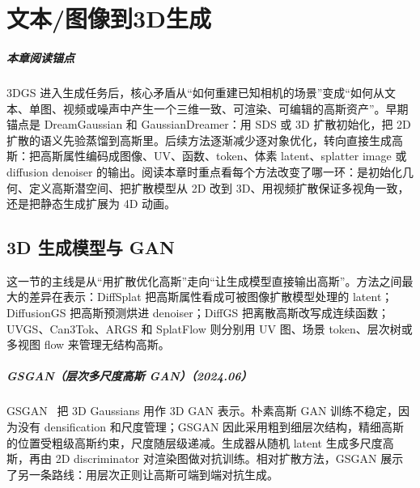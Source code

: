 \chapter{文本/图像到3D生成}

\paragraph*{本章阅读锚点}
3DGS 进入生成任务后，核心矛盾从“如何重建已知相机的场景”变成“如何从文本、单图、视频或噪声中产生一个三维一致、可渲染、可编辑的高斯资产”。早期锚点是 DreamGaussian 和 GaussianDreamer：用 SDS 或 3D 扩散初始化，把 2D 扩散的语义先验蒸馏到高斯里。后续方法逐渐减少逐对象优化，转向直接生成高斯：把高斯属性编码成图像、UV、函数、token、体素 latent、splatter image 或 diffusion denoiser 的输出。阅读本章时重点看每个方法改变了哪一环：是初始化几何、定义高斯潜空间、把扩散模型从 2D 改到 3D、用视频扩散保证多视角一致，还是把静态生成扩展为 4D 动画。

\section{3D 生成模型与 GAN}

这一节的主线是从“用扩散优化高斯”走向“让生成模型直接输出高斯”。方法之间最大的差异在表示：DiffSplat 把高斯属性看成可被图像扩散模型处理的 latent；DiffusionGS 把高斯预测烘进 denoiser；DiffGS 把离散高斯改写成连续函数；UVGS、Can3Tok、ARGS 和 SplatFlow 则分别用 UV 图、场景 token、层次树或多视图 flow 来管理无结构高斯。



\paragraph{GSGAN（层次多尺度高斯 GAN）（2024.06）}
GSGAN~\cite{2406_02968} 把 3D Gaussians 用作 3D GAN 表示。朴素高斯 GAN 训练不稳定，因为没有 densification 和尺度管理；GSGAN 因此采用粗到细层次结构，精细高斯的位置受粗级高斯约束，尺度随层级递减。生成器从随机 latent 生成多尺度高斯，再由 2D discriminator 对渲染图做对抗训练。相对扩散方法，GSGAN 展示了另一条路线：用层次正则让高斯可端到端对抗生成。

